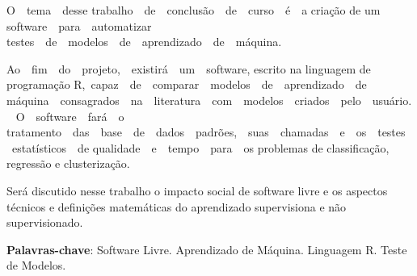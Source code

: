 


\begin{resumo}

O  tema  desse trabalho  de  conclusão  de  curso  é  a criação de um software  para  automatizar testes  de  modelos  de  aprendizado  de  máquina. 

Ao  fim  do  projeto,  existirá  um  software, escrito na linguagem de programação R, capaz  de  comparar  modelos  de  aprendizado  de máquina  consagrados  na  literatura  com  modelos  criados  pelo  usuário.  O  software  fará  o tratamento  das  base  de  dados  padrões,  suas  chamadas  e  os  testes  estatísticos  de qualidade  e  tempo  para  os problemas de classificação, regressão e clusterização.

Será discutido nesse trabalho o impacto social de software livre e os aspectos técnicos e definições matemáticas do aprendizado supervisiona e não supervisionado.

\textbf{Palavras-chave}: Software Livre. Aprendizado de Máquina. Linguagem R. Teste de Modelos.

 

\end{resumo}



